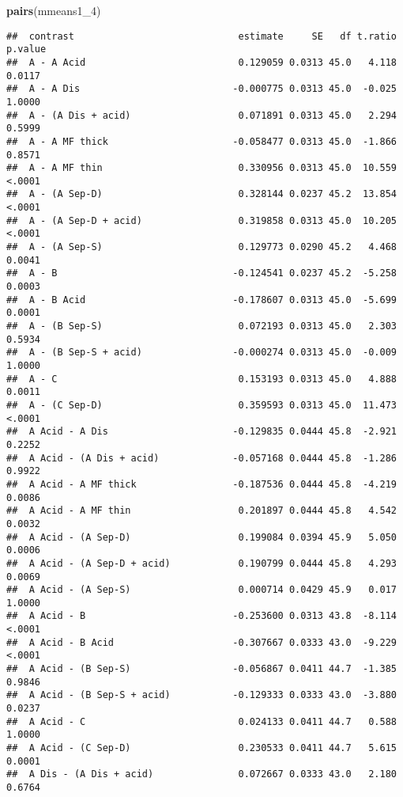\documentclass[
]{article}
\newenvironment{Shaded}{\begin{snugshade}}{\end{snugshade}}
\newcommand{\FunctionTok}[1]{\textcolor[rgb]{0.13,0.29,0.53}{\textbf{#1}}}
\newcommand{\NormalTok}[1]{#1}
\begin{document}
\begin{Shaded}
\begin{Highlighting}[]
\FunctionTok{pairs}\NormalTok{(mmeans1\_4)}
\end{Highlighting}
\end{Shaded}

\begin{verbatim}
##  contrast                             estimate     SE   df t.ratio p.value
##  A - A Acid                           0.129059 0.0313 45.0   4.118  0.0117
##  A - A Dis                           -0.000775 0.0313 45.0  -0.025  1.0000
##  A - (A Dis + acid)                   0.071891 0.0313 45.0   2.294  0.5999
##  A - A MF thick                      -0.058477 0.0313 45.0  -1.866  0.8571
##  A - A MF thin                        0.330956 0.0313 45.0  10.559  <.0001
##  A - (A Sep-D)                        0.328144 0.0237 45.2  13.854  <.0001
##  A - (A Sep-D + acid)                 0.319858 0.0313 45.0  10.205  <.0001
##  A - (A Sep-S)                        0.129773 0.0290 45.2   4.468  0.0041
##  A - B                               -0.124541 0.0237 45.2  -5.258  0.0003
##  A - B Acid                          -0.178607 0.0313 45.0  -5.699  0.0001
##  A - (B Sep-S)                        0.072193 0.0313 45.0   2.303  0.5934
##  A - (B Sep-S + acid)                -0.000274 0.0313 45.0  -0.009  1.0000
##  A - C                                0.153193 0.0313 45.0   4.888  0.0011
##  A - (C Sep-D)                        0.359593 0.0313 45.0  11.473  <.0001
##  A Acid - A Dis                      -0.129835 0.0444 45.8  -2.921  0.2252
##  A Acid - (A Dis + acid)             -0.057168 0.0444 45.8  -1.286  0.9922
##  A Acid - A MF thick                 -0.187536 0.0444 45.8  -4.219  0.0086
##  A Acid - A MF thin                   0.201897 0.0444 45.8   4.542  0.0032
##  A Acid - (A Sep-D)                   0.199084 0.0394 45.9   5.050  0.0006
##  A Acid - (A Sep-D + acid)            0.190799 0.0444 45.8   4.293  0.0069
##  A Acid - (A Sep-S)                   0.000714 0.0429 45.9   0.017  1.0000
##  A Acid - B                          -0.253600 0.0313 43.8  -8.114  <.0001
##  A Acid - B Acid                     -0.307667 0.0333 43.0  -9.229  <.0001
##  A Acid - (B Sep-S)                  -0.056867 0.0411 44.7  -1.385  0.9846
##  A Acid - (B Sep-S + acid)           -0.129333 0.0333 43.0  -3.880  0.0237
##  A Acid - C                           0.024133 0.0411 44.7   0.588  1.0000
##  A Acid - (C Sep-D)                   0.230533 0.0411 44.7   5.615  0.0001
##  A Dis - (A Dis + acid)               0.072667 0.0333 43.0   2.180  0.6764

\end{verbatim}
\end{document}
